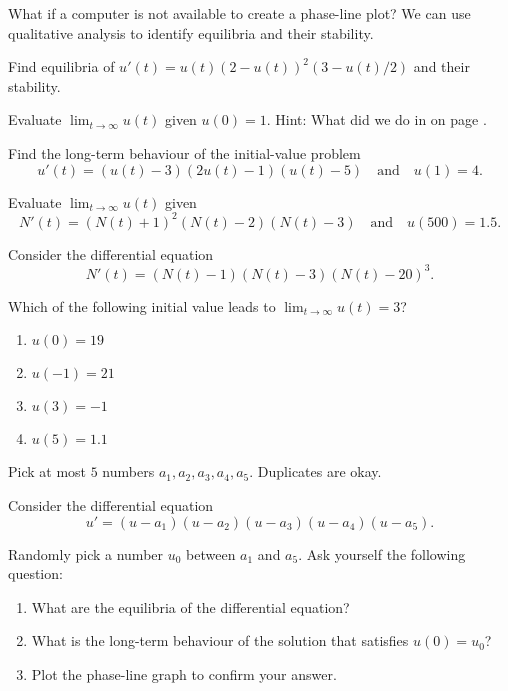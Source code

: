 \documentclass[../main.tex]{subfiles}
\begin{document}
What if a computer is not available to create a phase-line plot? We can use qualitative analysis to identify equilibria and their stability.

\begin{example}
  Find equilibria of \(u'(t) = u(t) ( 2 - u(t) )^{2} (3 - u(t)/2)\) and their stability.


  Evaluate \(\lim_{t \to \infty} u(t)\) given \(u(0) = 1\).  Hint: What did we do in \faStar{} on page \pageref{eq:diff-eq-logistic-equation-equilibria}.
\end{example}
\clearpage

\begin{example}
  Find the long-term behaviour of the initial-value problem 
  \[
    u'(t) = (u(t) - 3) (2u(t) - 1) (u(t) - 5) \quad\text{and}\quad u(1) = 4.
  \]
\end{example}


\begin{example}
  Evaluate \(\lim_{t \to \infty} u(t)\) given
  \[
    N'(t) = (N(t) + 1)^{2} (N(t) - 2) (N(t) - 3) \quad\text{and}\quad u(500) = 1.5.
  \]
\end{example}

\begin{example}
  Consider the differential equation
  \[
    N'(t) = (N(t) - 1) (N(t) - 3) (N(t) - 20)^{3}.
  \]

  Which of the following initial value leads to \(\lim_{t \to \infty} u(t) = 3\)?
  \begin{enumerate}[label=(\alph*)]
    \item \(u(0) = 19\)
    \item \(u(-1) = 21\)
    \item \(u(3) = -1\)
    \item \(u(5) = 1.1\)
  \end{enumerate}
\end{example}

\begin{example}
  Pick at most \(5\) numbers \(a_{1}, a_{2}, a_{3}, a_{4}, a_{5}\). Duplicates are okay.

  Consider the differential equation
  \[
    u' = (u - a_{1}) (u - a_{2})(u - a_{3})(u - a_{4})(u - a_{5}).
  \]

  Randomly pick a number \(u_{0}\) between \(a_{1}\) and \(a_{5}\).  Ask yourself the following question:
  \begin{enumerate}
    \item What are the equilibria of the differential equation?
    \item What is the long-term behaviour of the solution that satisfies \(u(0) = u_{0}\)?
    \item Plot the phase-line graph to confirm your answer.
  \end{enumerate}
\end{example}
\end{document}

